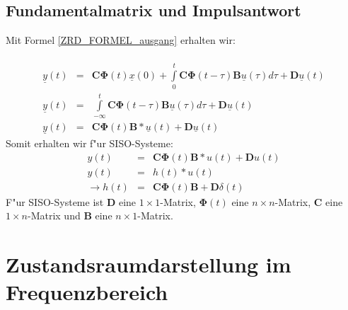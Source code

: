 \subsection{Fundamentalmatrix und Impulsantwort}
Mit Formel \ref{ZRD_FORMEL_ausgang} erhalten wir:\\~\\
\begin{eqnarray*}
    \underline{y}(t)&=&\boldsymbol{C}\boldsymbol{\Phi}(t)\underline{x}(0)+\int\limits_{0}^{t}\boldsymbol{C\Phi}(t-\tau)\boldsymbol{B}\underline{u}(\tau)d\tau+\boldsymbol{D}\underline{u}(t)\\
   \underline{y}(t)&=&\int\limits_{-\infty}^{t}\boldsymbol{C\Phi}(t-\tau)\boldsymbol{B}\underline{u}(\tau)d\tau+\boldsymbol{D}\underline{u}(t)\\
\underline{y}(t)&=&\boldsymbol{C\Phi}(t)\boldsymbol{B}\ast\underline{u}(t)+\boldsymbol{D}\underline{u}(t)
\end{eqnarray*}
Somit erhalten wir f"ur SISO-Systeme:
\begin{eqnarray}
y(t)&=&\boldsymbol{C\Phi}(t)\boldsymbol{B}\ast u (t)+\boldsymbol{D}u(t)\nonumber\\
y(t)&=& h(t)\ast u(t)  \nonumber\\
\rightarrow h(t)&=&\boldsymbol{C\Phi}(t)\boldsymbol{B}+\boldsymbol{D}\delta(t)
\end{eqnarray}
F"ur SISO-Systeme ist $\boldsymbol{D}$  eine $1\times 1$-Matrix, $\boldsymbol{\Phi}(t)$  eine $n\times n$-Matrix, $\boldsymbol{C}$  eine $1\times n$-Matrix und $\boldsymbol{B}$  eine $n\times 1$-Matrix.

\section{Zustandsraumdarstellung im Frequenzbereich}
